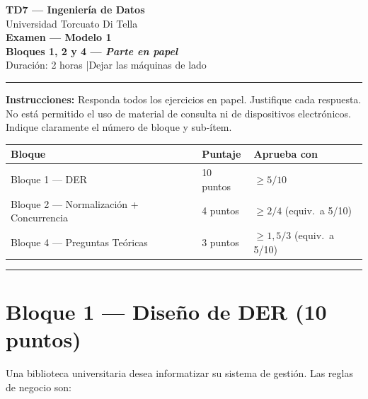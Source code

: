 \documentclass[11pt,a4paper]{article}
\begin{document}
\begin{center}
  {\LARGE\bfseries TD7 — Ingeniería de Datos}\\[6pt]
  {\large Universidad Torcuato Di Tella}\\[4pt]
  {\Large\bfseries Examen — Modelo 1}\\[2pt]
  {\large\bfseries Bloques 1, 2 y 4 \textnormal{---} \textit{Parte en papel}}\\[4pt]
  {\normalsize Duración: 2 horas \quad|\quad Dejar las máquinas de lado}
\end{center}
\noindent\rule{\linewidth}{0.8pt}
\vspace{2pt}

\noindent\textbf{Instrucciones:} Responda todos los ejercicios en papel. Justifique cada respuesta. No está permitido el uso de material de consulta ni de dispositivos electrónicos. Indique claramente el número de bloque y sub-ítem.

\vspace{4pt}

\begin{center}\small
\begin{tabular}{lll}
\toprule
\textbf{Bloque} & \textbf{Puntaje} & \textbf{Aprueba con} \\
\midrule
Bloque 1 — DER                    & 10 puntos & $\geq 5 / 10$ \\
Bloque 2 — Normalización + Concurrencia & 4 puntos  & $\geq 2 / 4$ \;(equiv.\ a 5/10) \\
Bloque 4 — Preguntas Teóricas     & 3 puntos  & $\geq 1{,}5 / 3$ \;(equiv.\ a 5/10) \\
\bottomrule
\end{tabular}
\end{center}

\vspace{4pt}
\noindent\rule{\linewidth}{0.4pt}

\section*{Bloque 1 — Diseño de DER \hfill\normalfont(10 puntos)}

Una biblioteca universitaria desea informatizar su sistema de gestión. Las reglas de negocio son:
\end{document}
